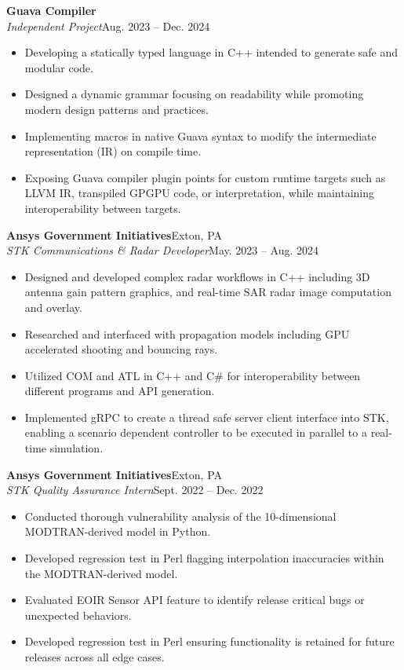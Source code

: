 \documentclass[10pt, letterpaper]{article}
\newcommand{\resumeentry}[4]{%
    \textbf{#1}\hfill #2\\%
    \textit{#3}\hfill #4%
}
\begin{document}
\vspace{4pt}
\resumeentry{Guava Compiler}{}{Independent Project}{Aug. 2023 -- Dec. 2024}
\vspace{-6pt}
\begin{itemize}
    \setlength{\itemsep}{0pt}
    \setlength{\parskip}{0pt}
    \setlength{\topsep}{0pt}
    \item Developing a statically typed language in C++ intended to generate safe and modular code.
    \item Designed a dynamic grammar focusing on readability while promoting modern design patterns and practices.
    \item Implementing macros in native Guava syntax to modify the intermediate representation (IR) on compile time.
    \item Exposing Guava compiler plugin points for custom runtime targets such as LLVM IR, transpiled GPGPU code, or interpretation, while maintaining interoperability between targets.
\end{itemize}

\vspace{4pt}
\resumeentry{Ansys Government Initiatives}{Exton, PA}{STK Communications \& Radar Developer}{May. 2023 -- Aug. 2024}
\vspace{-6pt}
\begin{itemize}
    \setlength{\itemsep}{0pt}
    \setlength{\parskip}{0pt}
    \setlength{\topsep}{0pt}
    \item Designed and developed complex radar workflows in C++ including 3D antenna gain pattern graphics, and real-time SAR radar image computation and overlay.
    \item Researched and interfaced with propagation models including GPU accelerated shooting and bouncing rays.
    \item Utilized COM and ATL in C++ and C\# for interoperability between different programs and API generation.
    \item Implemented gRPC to create a thread safe server client interface into STK, enabling a scenario dependent controller to be executed in parallel to a real-time simulation.
\end{itemize}

\vspace{4pt}
\resumeentry{Ansys Government Initiatives}{Exton, PA}{STK Quality Assurance Intern}{Sept. 2022 -- Dec. 2022}
\vspace{-6pt}
\begin{itemize}
    \setlength{\itemsep}{0pt}
    \setlength{\parskip}{0pt}
    \setlength{\topsep}{0pt}
    \item Conducted thorough vulnerability analysis of the 10-dimensional MODTRAN-derived model in Python.
    \item Developed regression test in Perl flagging interpolation inaccuracies within the MODTRAN-derived model.
    \item Evaluated EOIR Sensor API feature to identify release critical bugs or unexpected behaviors.
    \item Developed regression test in Perl ensuring functionality is retained for future releases across all edge cases.
\end{itemize}
\end{document}
